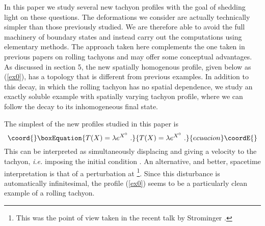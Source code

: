 \documentclass[a4paper,12pt]{article}
\begin{document}
In this paper we study  several new tachyon profiles with the goal of shedding light on these questions. The deformations  we consider are actually technically simpler than those 
previously studied. We are therefore able to avoid the full machinery of boundary states and instead carry out 
the computations using elementary methods. The approach taken here complements the one taken in previous papers on rolling tachyons and may offer some conceptual advantages. 
As discussed in section 5, the new spatially homogenous profile, given below as (\ref{ex0}), 
has a topology that is different from previous examples. 
In addition to this decay, in which the rolling tachyon has no spatial dependence, we study 
an exactly soluble example with spatially varying tachyon profile, where we can follow
the decay to its inhomogeneous final state. 




The simplest of the new profiles studied in this paper is 
\begin{equation}\coord{}\boxEquation{
T(X) = \lambda e^{X^0}~.
\label{ex0}
}{
T(X) = \lambda e^{X^0}~.
}{ecuacion}\coordE{}\end{equation}
This can be interpreted as simultaneously displacing 
and giving a velocity to the tachyon, {\it i.e.} imposing the initial condition 
\coordHE{}. An alternative, and better, spacetime interpretation is 
that of a perturbation at \coordHE{} \footnote{This was the point of view taken in the recent talk
by Strominger \cite{Strominger:2002pc}.}. Since this disturbance is automatically infinitesimal, 
the profile (\ref{ex0}) seems to be a particularly clean example of a rolling tachyon.
\end{document}
